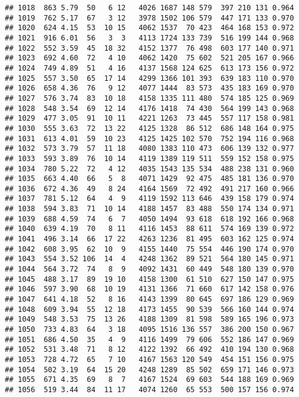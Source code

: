 \documentclass[]{article}
\begin{document}
\begin{verbatim}
## 1018  863 5.79  50   6 12   4026 1687 148 579  397 210 131 0.964
## 1019  762 5.17  67   3 12   3978 1502 106 579  447 171 133 0.970
## 1020  624 4.15  53  10 15   4062 1537  70 423  464 168 153 0.972
## 1021  916 6.01  56   3  3   4113 1724 133 739  516 199 144 0.968
## 1022  552 3.59  45  18 32   4152 1377  76 498  603 177 140 0.971
## 1023  692 4.60  72   4 10   4062 1420  75 602  521 205 167 0.966
## 1024  749 4.89  51   4 16   4137 1568 124 625  613 173 156 0.972
## 1025  557 3.50  65  17 14   4299 1366 101 393  639 183 110 0.970
## 1026  658 4.36  76   9 12   4077 1444  83 573  435 183 169 0.970
## 1027  576 3.74  83  10 18   4158 1335 111 480  574 185 125 0.969
## 1028  548 3.54  69  12 14   4176 1418  74 430  564 199 143 0.968
## 1029  477 3.05  91  10 11   4221 1263  73 445  557 117 158 0.981
## 1030  555 3.63  72  13 22   4125 1328  86 512  686 148 164 0.975
## 1031  613 4.01  59  10 23   4125 1425 102 570  752 194 116 0.968
## 1032  573 3.79  57  11 18   4080 1383 110 473  606 139 132 0.977
## 1033  593 3.89  76  10 14   4119 1389 119 511  559 152 158 0.975
## 1034  780 5.22  72   4 12   4035 1543 135 534  488 238 131 0.960
## 1035  663 4.40  66   5  8   4071 1429  92 475  485 181 136 0.970
## 1036  672 4.36  49   8 24   4164 1569  72 492  491 217 160 0.966
## 1037  781 5.12  64   4  9   4119 1592 113 646  439 158 179 0.974
## 1038  594 3.83  71  10 14   4188 1457  83 488  550 174 134 0.971
## 1039  688 4.59  74   6  7   4050 1494  93 618  618 192 166 0.968
## 1040  639 4.19  70   8 11   4116 1453  88 611  574 169 139 0.972
## 1041  496 3.14  66  17 22   4263 1236  81 495  603 162 125 0.974
## 1042  608 3.95  62  10  9   4155 1440  75 554  446 190 174 0.970
## 1043  554 3.52 106  14  4   4248 1362  89 521  564 180 145 0.971
## 1044  564 3.72  74   8  9   4092 1431  60 449  548 180 139 0.970
## 1045  488 3.17  89  19 10   4158 1300  61 510  627 150 147 0.975
## 1046  597 3.90  68  10 19   4131 1366  71 660  617 142 158 0.976
## 1047  641 4.18  52   8 16   4143 1399  80 645  697 186 129 0.969
## 1048  609 3.94  55  12 18   4173 1455  90 539  566 160 144 0.974
## 1049  548 3.53  75  13 26   4188 1309  81 598  589 165 196 0.973
## 1050  733 4.83  64   3 18   4095 1516 136 557  386 200 150 0.967
## 1051  686 4.50  35   4  9   4116 1499  79 606  552 186 147 0.969
## 1052  531 3.48  71   8 12   4122 1392  66 492  410 194 130 0.968
## 1053  728 4.72  65   7 10   4167 1563 120 549  454 151 156 0.975
## 1054  502 3.19  64  15 20   4248 1289  85 502  659 171 146 0.973
## 1055  671 4.35  69   8  7   4167 1524  69 603  544 188 169 0.969
## 1056  519 3.44  84  11 17   4074 1260  65 553  500 157 156 0.974

\end{verbatim}
\end{document}
